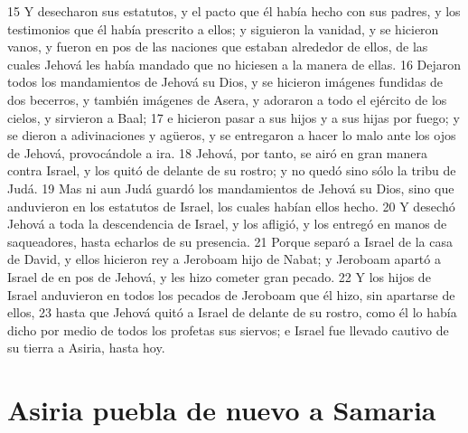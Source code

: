 15 Y desecharon sus estatutos, y el pacto que él había hecho con sus padres, y los testimonios que él había prescrito a ellos; y siguieron la vanidad, y se hicieron vanos, y fueron en pos de las naciones que estaban alrededor de ellos, de las cuales Jehová les había mandado que no hiciesen a la manera de ellas.
16 Dejaron todos los mandamientos de Jehová su Dios, y se hicieron imágenes fundidas de dos becerros, y también imágenes de Asera, y adoraron a todo el ejército de los cielos, y sirvieron a Baal;
17 e hicieron pasar a sus hijos y a sus hijas por fuego; y se dieron a adivinaciones y agüeros, y se entregaron a hacer lo malo ante los ojos de Jehová, provocándole a ira.
18 Jehová, por tanto, se airó en gran manera contra Israel, y los quitó de delante de su rostro; y no quedó sino sólo la tribu de Judá.
19 Mas ni aun Judá guardó los mandamientos de Jehová su Dios, sino que anduvieron en los estatutos de Israel, los cuales habían ellos hecho.
20 Y desechó Jehová a toda la descendencia de Israel, y los afligió, y los entregó en manos de saqueadores, hasta echarlos de su presencia.
21 Porque separó a Israel de la casa de David, y ellos hicieron rey a Jeroboam hijo de Nabat; y Jeroboam apartó a Israel de en pos de Jehová, y les hizo cometer gran pecado.
22 Y los hijos de Israel anduvieron en todos los pecados de Jeroboam que él hizo, sin apartarse de ellos,
23 hasta que Jehová quitó a Israel de delante de su rostro, como él lo había dicho por medio de todos los profetas sus siervos; e Israel fue llevado cautivo de su tierra a Asiria, hasta hoy.

\section*{Asiria puebla de nuevo a Samaria}

